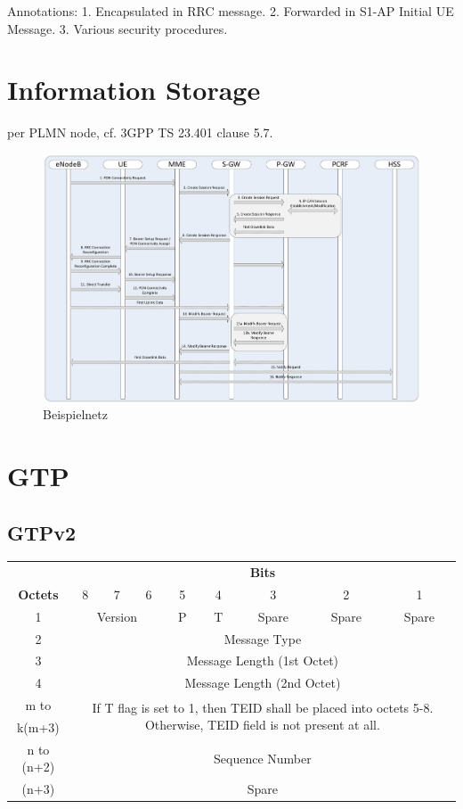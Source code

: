 Annotations:
1. Encapsulated in RRC message.
2. Forwarded in S1-AP Initial UE Message.
3. Various security procedures.


\section{Information Storage}
per PLMN node, cf. 3GPP TS 23.401 clause 5.7.

\begin{figure}[htbp]
	\centering
	\includegraphics[width=1.0\textwidth]{images/3gpp/UE-requested-PDN-connectivity.pdf}
	\caption{Beispielnetz}\label{fig:3gpp-uepdnreq}
\end{figure}


\section{GTP}
\subsection{GTPv2}



\begin{tabular}{c|c|c|c|c|c|c|c|c|}
\multicolumn{1}{c}{} & \multicolumn{8}{c}{\textbf{Bits}} \\
\cline{2-9} \textbf{Octets} & 8 & 7 & 6 & 5 & 4 & 3 & 2 & 1 \\ 
\cline{2-9} 1 & \multicolumn{3}{c|}{Version}  & P & T & Spare & Spare & Spare \\ 
\cline{2-9} 2 & \multicolumn{8}{c|}{Message Type}  \\ 
\cline{2-9} 3 & \multicolumn{8}{c|}{Message Length (1st Octet)}  \\ 
\cline{2-9} 4 & \multicolumn{8}{c|}{Message Length (2nd Octet)}  \\ 
\cline{2-9} m to & \multicolumn{8}{c|}{\multirow{2}{10cm}{If T flag is set to 1, then TEID shall be placed into octets 5-8. Otherwise, TEID field is not present at all.}} \\ 
 k(m+3) & \multicolumn{8}{c|}{} \\ 
\cline{2-9} n to (n+2) & \multicolumn{8}{c|}{Sequence Number} \\ 
\cline{2-9} (n+3) & \multicolumn{8}{c|}{Spare} \\ 
\cline{2-9} 
\end{tabular} 
